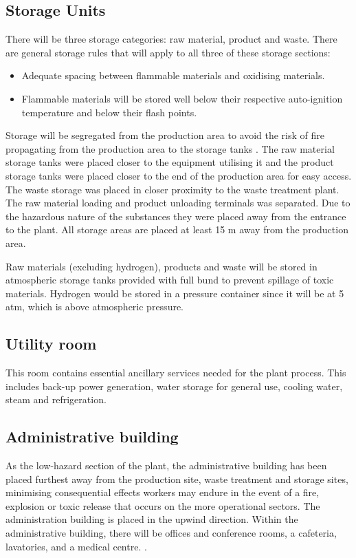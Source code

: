 \subsection{Storage Units}

There will be three storage categories: raw material, product and waste. There are general storage rules that will apply to all three of these storage sections: 

\begin{itemize}
    \item Adequate spacing between flammable materials and oxidising materials.
    \item Flammable materials will be stored well below their respective auto-ignition temperature and below their flash points.
\end{itemize}

Storage will be segregated from the production area to avoid the risk of fire propagating from the production area to the storage tanks \cite{mannan_lees_2012}. The raw material storage tanks were placed closer to the equipment utilising it and the product storage tanks were placed closer to the end of the production area for easy access. The waste storage was placed in closer proximity to the waste treatment plant. The raw material loading and product unloading terminals was separated. Due to the hazardous nature of the substances they were placed away from the entrance to the plant. All storage areas are placed at least 15 m away from the production area. 

Raw materials (excluding hydrogen), products and waste will be stored in atmospheric storage tanks provided with full bund to prevent spillage of toxic materials. Hydrogen would be stored in a pressure container since it will be at 5 atm, which is above atmospheric pressure.


\subsection{Utility room}
This room contains essential ancillary services needed for the plant process. This includes back-up power generation, water storage for general use, cooling water, steam and refrigeration. 

\subsection{Administrative building}

As the low-hazard section of the plant, the administrative building has been placed furthest away from the production site, waste treatment and storage sites, minimising consequential effects workers may endure in the event of a fire, explosion or toxic release that occurs on the more operational sectors. The administration building is placed in the upwind direction. Within the administrative building, there will be offices and conference rooms, a cafeteria, lavatories, and a medical centre. \cite{sinnott_coulson_2005}. 

